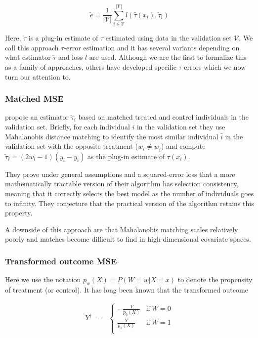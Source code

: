 \begin{equation}
\check e = \frac{1}{|\mathcal{V}|}\sum_{i \in \mathcal{V}}^{|\mathcal{V}|}  l(\hat \tau (x_i), \check \tau_i)
\label{te-error}
\end{equation}

Here, $\check \tau$ is a plug-in estimate of $\tau$ estimated using data in the validation set $\mathcal{V}$. We call this approach $\tau$-error estimation and it has several variants depending on what estimator $\check\tau$ and loss $l$ are used. Although we are the first to formalize this as a family of approaches, others have developed specific $\tau$-errors which we now turn our attention to.

\subsubsection{Matched MSE}
\label{match-mse}

\citet{Rolling:2013kz} propose an estimator $\check \tau_i$ based on matched treated and control individuals in the validation set. Briefly, for each individual $i$ in the validation set they use Mahalanobis distance matching to identify the most similar individual $\bar{i}$ in the validation set with the opposite treatment ($w_i \ne w_{\bar i}$) and compute $\check \tau_i = (2w_i -1)(y_i - y_{\bar i})$ as the plug-in estimate of $\tau(x_i)$. 

They prove under general assumptions and a squared-error loss that a more mathematically tractable version of their algorithm has selection consistency, meaning that it correctly selects the best model as the number of individuals goes to infinity. They conjecture that the practical version of the algorithm retains this property.

A downside of this approach are that Mahalanobis matching scales relatively poorly and matches become difficult to find in high-dimensional covariate spaces.

\subsubsection{Transformed outcome MSE}
\label{trans-mse}

Here we use the notation $p_w(X) = P(W=w|X=x)$ to denote the propensity of treatment (or control). It has long been known that the transformed outcome 

\begin{equation}
\label{transformed-outcome}
	\begin{array}{rcl}
	Y^{\dagger}  &=&
	\begin{cases}
		-\frac{Y}{p_0(X)} & \text{if} \ W=0 \\
		\frac{Y}{p_1(X)} & \text{if} \ W=1\\
	\end{cases} \\
	\end{array}
\end{equation}

